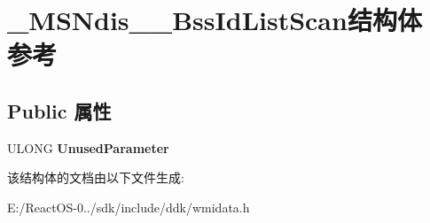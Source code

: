 \hypertarget{struct___m_s_ndis__80211___bss_id_list_scan}{}\section{\+\_\+\+M\+S\+Ndis\+\_\+\_\+\+Bss\+Id\+List\+Scan结构体 参考}
\label{struct___m_s_ndis__80211___bss_id_list_scan}
\subsection*{Public 属性}
\begin{DoxyCompactItemize}
\item 
\mbox{\label{struct___m_s_ndis__80211___bss_id_list_scan_acdd97bdca6ea75dee0f685c5a6caad4c}} 
U\+L\+O\+NG {\bfseries Unused\+Parameter}
\end{DoxyCompactItemize}


该结构体的文档由以下文件生成\+:\begin{DoxyCompactItemize}
\item 
E\+:/\+React\+O\+S-\/0../sdk/include/ddk/wmidata.\+h\end{DoxyCompactItemize}
